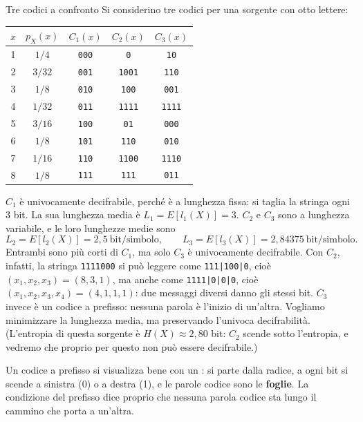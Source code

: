 \begin{esempio}{Tre codici a confronto}
Si considerino tre codici per una sorgente con otto lettere:
\begin{center}
\renewcommand{\arraystretch}{1.2}
\begin{tabular}{@{}c|c|c|c|c@{}}
  $x$ & $p_X(x)$ & $C_1(x)$ & $C_2(x)$ & $C_3(x)$ \\ \hline
  1 & $1/4$ & \texttt{000} & \texttt{0} & \texttt{10} \\
  2 & $3/32$ & \texttt{001} & \texttt{1001} & \texttt{110} \\
  3 & $1/8$ & \texttt{010} & \texttt{100} & \texttt{001} \\
  4 & $1/32$ & \texttt{011} & \texttt{1111} & \texttt{1111} \\
  5 & $3/16$ & \texttt{100} & \texttt{01} & \texttt{000} \\
  6 & $1/8$ & \texttt{101} & \texttt{110} & \texttt{010} \\
  7 & $1/16$ & \texttt{110} & \texttt{1100} & \texttt{1110} \\
  8 & $1/8$ & \texttt{111} & \texttt{111} & \texttt{011}
\end{tabular}
\end{center}
$C_1$ è univocamente decifrabile, perché è a lunghezza fissa: si taglia la stringa ogni 3 bit. La sua lunghezza media
è $L_1 = E[l_1(X)] = 3$. $C_2$ e $C_3$ sono a lunghezza variabile, e le loro lunghezze medie sono
\[ L_2 = E[l_2(X)] = 2{,}5 \ \text{bit/simbolo} , \qquad L_3 = E[l_3(X)] = 2{,}84375 \ \text{bit/simbolo} . \]
Entrambi sono più corti di $C_1$, ma solo $C_3$ è univocamente decifrabile. Con $C_2$, infatti, la stringa
\texttt{1111000} si può leggere come \texttt{111|100|0}, cioè $(x_1, x_2, x_3) = (8, 3, 1)$, ma anche come
\texttt{1111|0|0|0}, cioè $(x_1, x_2, x_3, x_4) = (4, 1, 1, 1)$: due messaggi diversi danno gli stessi bit. $C_3$
invece è un codice a prefisso: nessuna parola è l'inizio di un'altra. Vogliamo minimizzare la lunghezza media, ma
preservando l'univoca decifrabilità. (L'entropia di questa sorgente è $H(X) \approx 2{,}80$ bit: $C_2$ scende sotto
l'entropia, e vedremo che proprio per questo non può essere decifrabile.)
\end{esempio}

Un codice a prefisso si visualizza bene con un : si parte dalla radice, a ogni bit si scende a
sinistra (0) o a destra (1), e le parole codice sono le \textbf{foglie}. La condizione del prefisso dice proprio che
nessuna parola codice sta lungo il cammino che porta a un'altra.


